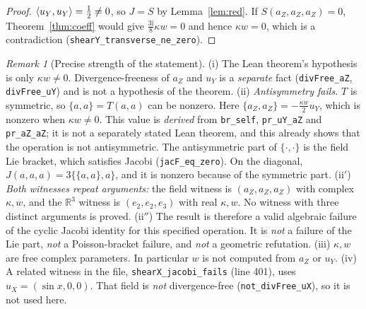 \documentclass[11pt]{article}\emergencystretch=2em
\theoremstyle{definition}\newtheorem{definition}[theorem]{Definition}\theoremstyle{remark}\newtheorem{remark}[theorem]{Remark}
\newcommand{\ii}{\mathrm{i}}
\begin{document}
\begin{proof}
$\langle u_Y,u_Y\rangle=\tfrac12\ne0$, so $J=S$ by Lemma~\ref{lem:red}. If $S(a_Z,a_Z,a_Z)=0$, Theorem~\ref{thm:coeff} would give $\tfrac{3\ii}{8}\kappa w=0$ and hence $\kappa w=0$, which is a contradiction (\texttt{shearY\_transverse\_ne\_zero}).
\end{proof}
\begin{remark}[Precise strength of the statement]
(i) The Lean theorem's hypothesis is only $\kappa w\ne0$. Divergence-freeness of $a_Z$ and $u_Y$ is a \emph{separate} fact (\texttt{divFree\_aZ}, \texttt{divFree\_uY}) and is not a hypothesis of the theorem.
(ii) \emph{Antisymmetry fails.} $T$ is symmetric, so $\{a,a\}=T(a,a)$ can be nonzero. Here $\{a_Z,a_Z\}=-\tfrac{\kappa w}{2}u_Y$, which is nonzero when $\kappa w\ne0$. This value is \emph{derived} from \texttt{br\_self}, \texttt{pr\_uY\_aZ} and \texttt{pr\_aZ\_aZ}; it is not a separately stated Lean theorem, and this already shows that the operation is not antisymmetric. The antisymmetric part of $\{\cdot,\cdot\}$ is the field Lie bracket, which satisfies Jacobi (\texttt{jacF\_eq\_zero}). On the diagonal, $J(a,a,a)=3\{\{a,a\},a\}$, and it is nonzero because of the symmetric part.
(ii$'$) \emph{Both witnesses repeat arguments:} the field witness is $(a_Z,a_Z,a_Z)$ with complex $\kappa,w$, and the $\mathbb R^3$ witness is $(e_2,e_2,e_3)$ with real $\kappa,w$. No witness with three distinct arguments is proved.
(ii$''$) The result is therefore a valid algebraic failure of the cyclic Jacobi identity for this specified operation. It is \emph{not} a failure of the Lie part, \emph{not} a Poisson-bracket failure, and \emph{not} a geometric refutation.
(iii) $\kappa,w$ are free complex parameters. In particular $w$ is not computed from $a_Z$ or $u_Y$.
(iv) A related witness in the file, \texttt{shearX\_jacobi\_fails} (line 401), uses $u_X=(\sin x,0,0)$. That field is \emph{not} divergence-free (\texttt{not\_divFree\_uX}), so it is not used here.
\end{remark}
\end{document}
